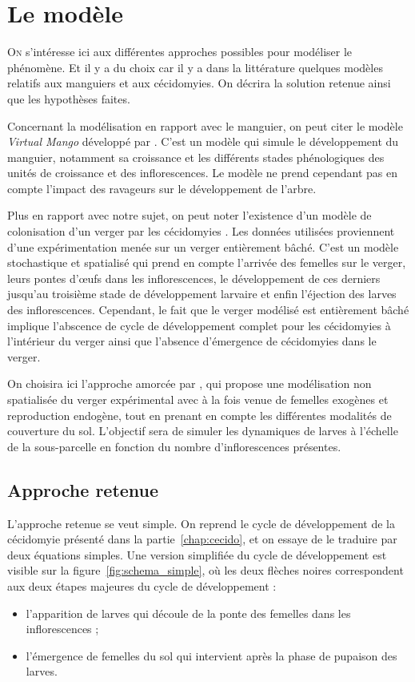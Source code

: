 \chapter{Le modèle}

\lettrine{O}{n} s'intéresse ici aux différentes approches possibles pour modéliser le phénomène. 
Et il y a du choix car il y a dans la littérature quelques modèles relatifs aux manguiers et aux cécidomyies.
On décrira la solution retenue ainsi que les hypothèses faites.

Concernant la modélisation en rapport avec le manguier, on peut citer le modèle \emph{Virtual Mango} développé par \citet{fred}.
C'est un modèle qui simule le développement du manguier, notamment sa croissance et les différents stades phénologiques des unités de croissance et des inflorescences.
Le modèle ne prend cependant pas en compte l'impact des ravageurs sur le développement de l'arbre.

Plus en rapport avec notre sujet, on peut noter l'existence d'un modèle de colonisation d'un verger par les cécidomyies \citep{paul}. 
Les données utilisées proviennent d'une expérimentation menée sur un verger entièrement bâché. 
C'est un modèle stochastique et spatialisé qui prend en compte l'arrivée des femelles sur le verger, leurs pontes d'œufs dans les inflorescences, le développement de ces derniers jusqu'au troisième stade de développement larvaire et enfin l'éjection des larves des inflorescences.
Cependant, le fait que le verger modélisé est entièrement bâché implique l'abscence de cycle de développement complet pour les cécidomyies à l'intérieur du verger ainsi que l'absence d'émergence de cécidomyies dans le verger.

On choisira ici l'approche amorcée par \citet{laurie}, qui propose une modélisation non spatialisée du verger expérimental avec à la fois venue de femelles exogènes et reproduction endogène, tout en prenant en compte les différentes modalités de couverture du sol.
L'objectif sera de simuler les dynamiques de larves à l'échelle de la sous-parcelle en fonction du nombre d'inflorescences présentes.

\section{Approche retenue}

L'approche retenue se veut simple.
On reprend le cycle de développement de la cécidomyie présenté dans la partie~\ref{chap:cecido}, et on essaye de le traduire par deux équations simples.
Une version simplifiée du cycle de développement est visible sur la figure~\ref{fig:schema_simple}, où les deux flèches noires correspondent aux deux étapes majeures du cycle de développement :
\begin{itemize}
 \item l'apparition de larves qui découle de la ponte des femelles dans les inflorescences ;
 \item l'émergence de femelles du sol qui intervient après la phase de pupaison des larves.
 \end{itemize}



